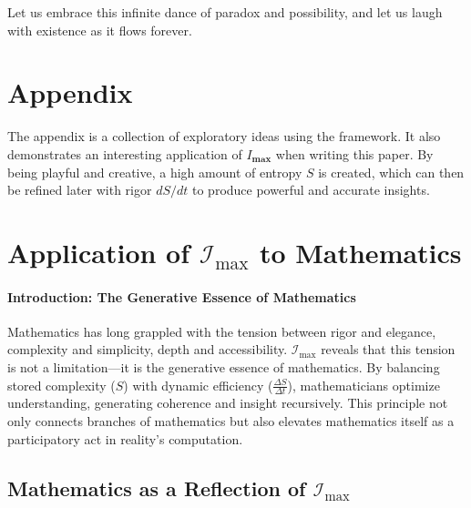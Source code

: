\documentclass[12pt]{article}
\begin{document}
Let us embrace this infinite dance of paradox and possibility, and let us laugh with existence as it flows forever.


\appendix
\renewcommand{\thesection}{\Roman{section}}
\section{Appendix}
The appendix is a collection of exploratory ideas using the framework. It also demonstrates an interesting application of $I_\textbf{max}$ when writing this paper. By being playful and creative, a high amount of entropy $S$ is created, which can then be refined later with rigor $dS/dt$ to produce powerful and accurate insights.

\section{Application of \(\mathcal{I}_{\text{max}}\) to Mathematics}

\paragraph{Introduction: The Generative Essence of Mathematics}
Mathematics has long grappled with the tension between rigor and elegance, complexity and simplicity, depth and accessibility. \(\mathcal{I}_{\text{max}}\) reveals that this tension is not a limitation—it is the generative essence of mathematics. By balancing stored complexity (\(S\)) with dynamic efficiency (\(\frac{\Delta S}{\Delta t}\)), mathematicians optimize understanding, generating coherence and insight recursively. This principle not only connects branches of mathematics but also elevates mathematics itself as a participatory act in reality’s computation.

\subsection{Mathematics as a Reflection of \(\mathcal{I}_{\text{max}}\)}
\end{document}
